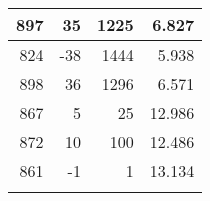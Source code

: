 \begin{longtable}{|r|r|r|r|}
	897                                                                                             & 35                                                & 1225                                                 & 6.827                                                                                          \\ \hline
	824                                                                                             & -38                                               & 1444                                                 & 5.938                                                                                          \\ \hline
	898                                                                                             & 36                                                & 1296                                                 & 6.571                                                                                          \\ \hline
	867                                                                                             & 5                                                 & 25                                                   & 12.986                                                                                         \\ \hline
	872                                                                                             & 10                                                & 100                                                  & 12.486                                                                                         \\ \hline
	861                                                                                             & -1                                                & 1                                                    & 13.134                                                                                         \\ \hline
	\caption{}
	\label{tab:1204-obs-gauss}
\end{longtable}

